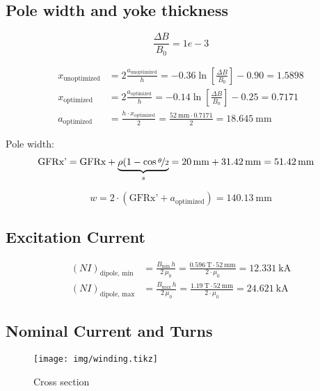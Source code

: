 \documentclass[10pt,a4paper,noendnumber=true]{scrartcl}
\begin{document}
\subsection{Pole width and yoke thickness}

\begin{equation}
    \frac{\Delta B}{B_0} = {1e-3}
\end{equation}

\begin{align}
    x_\text{unoptimized} &= 2\frac{a_\text{unoptimized}}{h} = -0.36 \ln\left[\frac{\Delta B}{B_0}\right] - 0.90 = 1.5898 \\
    x_\text{optimized} &= 2\frac{a_\text{optimized}}{h} = -0.14 \ln\left[\frac{\Delta B}{B_0}\right] -0.25 = 0.7171 \\
    a_\text{optimized} &= \frac{h\cdot x_\text{optimized}}{2} = \frac{\SI{52}{\mm} \cdot 0.7171}{2} = \SI{18.645}{\mm}
\end{align}

Pole width:
\begin{align}
    \text{GFRx'} = \text{GFRx} + \underbrace{\rho(1-\cos \nicefrac{\theta}{2}}_s = \SI{20}{\mm} + \SI{31.42}{\mm} 
    &= \SI{51.42}{\mm}
\end{align}

\begin{equation}
    w = 2\cdot \left(\text{GFRx'} + a_\text{optimized}\right) = \SI{140.13}{\mm}
\end{equation}

\subsection{Excitation Current}
\begin{align}
    (NI)_\text{dipole, min} &= \frac{B_\text{min}\,h}{2\,\mu_0} = \frac{\SI{0.596}{\tesla} \cdot \SI{52}{\mm}}{2\cdot \mu_0} = \SI{12.331}{\kilo\ampere}\\
    (NI)_\text{dipole, max} &= \frac{B_\text{max}\,h}{2\,\mu_0} = \frac{\SI{1.19}{\tesla} \cdot \SI{52}{\mm}}{2\cdot \mu_0} = \SI{24.621}{\kilo\ampere}
\end{align}

\subsection{Nominal Current and Turns}

\begin{figure}[H]
\centering
\texttt{[image: img/winding.tikz]}
\caption{Cross section}
\end{figure}
\end{document}

